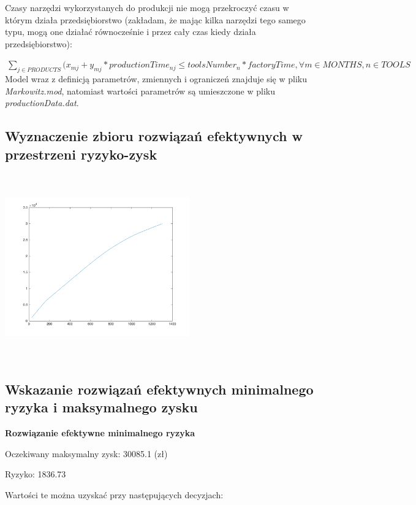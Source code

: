 \documentclass[11pt]{article} %
\begin{document}
Czasy narzędzi wykorzystanych do produkcji nie mogą przekroczyć czasu w którym działa przedsiębiorstwo (zakładam, że mając kilka narzędzi tego samego typu, mogą one działać równocześnie i przez cały czas kiedy działa przedsiębiorstwo):

$\ \sum_{j \in PRODUCTS} (x_{mj} + y_{mj} * productionTime_{nj} \leqslant toolsNumber_n*factoryTime, \forall m \in MONTHS, n \in TOOLS $
\leavevmode \\

Model wraz z definicją parametrów, zmiennych i ograniczeń znajduje się w pliku \emph{Markowitz.mod}, natomiast wartości parametrów są umieszczone w pliku \emph{productionData.dat}.

\subsection{Wyznaczenie zbioru rozwiązań efektywnych w przestrzeni ryzyko-zysk}

\includegraphics[width=8cm, height=8cm]{profit-risk}

\subsection{Wskazanie rozwiązań efektywnych minimalnego ryzyka i maksymalnego zysku}

\textbf{Rozwiązanie efektywne minimalnego ryzyka}

Oczekiwany maksymalny zysk: 30085.1 (zł)

Ryzyko: 1836.73

Wartości te można uzyskać przy następujących decyzjach:
\end{document}
